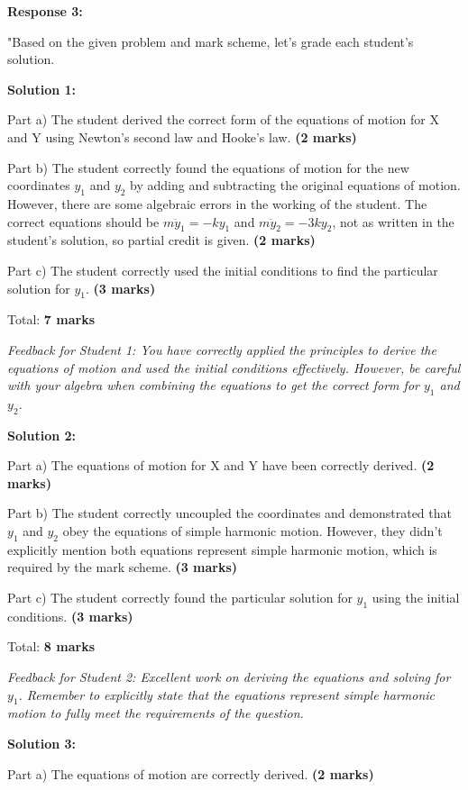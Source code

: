 \documentclass[a4paper,11pt]{article}
\begin{document}
\textbf{Response 3:}

"Based on the given problem and mark scheme, let's grade each student's solution.

\textbf{Solution 1:}

Part a) The student derived the correct form of the equations of motion for X and Y using Newton’s second law and Hooke's law. \textbf{(2 marks)}

Part b) The student correctly found the equations of motion for the new coordinates \( y_{1} \) and \( y_{2} \) by adding and subtracting the original equations of motion. However, there are some algebraic errors in the working of the student. The correct equations should be \( m \ddot{y}_{1} = -k y_1 \) and \( m \ddot{y}_{2} = -3k y_2 \), not as written in the student's solution, so partial credit is given. \textbf{(2 marks)}

Part c) The student correctly used the initial conditions to find the particular solution for \( y_{1} \). \textbf{(3 marks)}

Total: \textbf{7 marks}

\emph{Feedback for Student 1: You have correctly applied the principles to derive the equations of motion and used the initial conditions effectively. However, be careful with your algebra when combining the equations to get the correct form for \( y_{1} \) and \( y_{2} \).}

\textbf{Solution 2:}

Part a) The equations of motion for X and Y have been correctly derived. \textbf{(2 marks)}

Part b) The student correctly uncoupled the coordinates and demonstrated that \( y_{1} \) and \( y_{2} \) obey the equations of simple harmonic motion. However, they didn’t explicitly mention both equations represent simple harmonic motion, which is required by the mark scheme. \textbf{(3 marks)}

Part c) The student correctly found the particular solution for \( y_{1} \) using the initial conditions. \textbf{(3 marks)}

Total: \textbf{8 marks}

\emph{Feedback for Student 2: Excellent work on deriving the equations and solving for \( y_{1} \). Remember to explicitly state that the equations represent simple harmonic motion to fully meet the requirements of the question.}

\textbf{Solution 3:}

Part a) The equations of motion are correctly derived. \textbf{(2 marks)}
\end{document}
